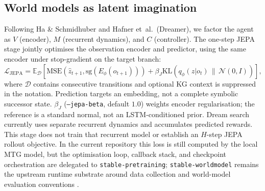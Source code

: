 \documentclass[11pt,a4paper]{article}
\begin{document}
\subsection{World models as latent imagination}
Following Ha \& Schmidhuber and Hafner et~al.\ (Dreamer), we factor the
agent as $V$ (encoder), $M$ (recurrent dynamics), and $C$ (controller).
The one-step JEPA stage jointly optimises the observation encoder and
predictor, using the same encoder under stop-gradient on the target branch:
%
\begin{equation}
\mathcal{L}_{\text{JEPA}} =
 \mathbb E_{\mathcal D}\!\left[
 \mathrm{MSE}\!\left(\hat z_{t+1},\mathrm{sg}(E_\phi(o_{t+1}))\right)
 +\beta_J\mathrm{KL}\!\left(q_\phi(z|o_t)\,\|\,\mathcal N(0,I)\right)
 \right],
\end{equation}
%
where $\mathcal D$ contains consecutive transitions and optional KG context
is suppressed in the notation. Prediction targets an embedding, not a
complete symbolic successor state. $\beta_J$ (\texttt{--jepa-beta}, default
$1.0$) weights encoder regularisation; the reference is a standard normal,
not an LSTM-conditioned prior. Dream search currently uses separate
recurrent dynamics and accumulates predicted rewards. This stage does not
train that recurrent model or establish an $H$-step JEPA rollout objective.
In the current repository this loss is still computed by the local MTG model, but the optimisation loop, callback stack, and checkpoint orchestration are delegated to \texttt{stable-pretraining}; \texttt{stable-worldmodel} remains the upstream runtime substrate around data collection and world-model evaluation conventions \cite{balestriero2025stable,maes_lelidec2026swm}.
\end{document}
